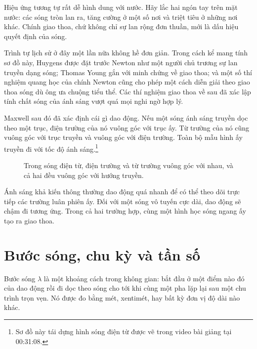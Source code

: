 Hiệu ứng tương tự rất dễ hình dung với nước. Hãy lắc hai ngón tay trên mặt nước: các sóng tròn lan ra, tăng cường ở một số nơi và triệt tiêu ở những nơi khác. Chính giao thoa, chứ không chỉ sự lan rộng đơn thuần, mới là dấu hiệu quyết định của sóng.

Trình tự lịch sử ở đây một lần nữa không hề đơn giản. Trong cách kể mang tính sơ đồ này, Huygens được đặt trước Newton như một người chủ trương sự lan truyền dạng sóng; Thomas Young gắn với minh chứng về giao thoa; và một số thí nghiệm quang học của chính Newton cũng cho phép một cách diễn giải theo giao thoa sóng dù ông ưa chuộng tiểu thể. Các thí nghiệm giao thoa về sau đã xác lập tính chất sóng của ánh sáng vượt quá mọi nghi ngờ hợp lý.

Maxwell sau đó đã xác định cái gì dao động. Nếu một sóng ánh sáng truyền dọc theo một trục, điện trường của nó vuông góc với trục ấy. Từ trường của nó cũng vuông góc với trục truyền và vuông góc với điện trường. Toàn bộ mẫu hình ấy truyền đi với tốc độ ánh sáng.\footnote{Sơ đồ này tái dựng hình sóng điện từ được vẽ trong video bài giảng tại 00:31:08.}

\begin{figure}[h]
\centering
{}
\caption{Trong sóng điện từ, điện trường và từ trường vuông góc với nhau, và cả hai đều vuông góc với hướng truyền.}
\end{figure}

Ánh sáng khả kiến thông thường dao động quá nhanh để có thể theo dõi trực tiếp các trường luân phiên ấy. Đối với một sóng vô tuyến cực dài, dao động sẽ chậm đi tương ứng. Trong cả hai trường hợp, cùng một hình học sóng ngang ấy tạo ra giao thoa.

\section{Bước sóng, chu kỳ và tần số}

Bước sóng \(\lambda\) là một khoảng cách trong không gian: bắt đầu ở một điểm nào đó của dao động rồi đi dọc theo sóng cho tới khi cùng một pha lặp lại sau một chu trình trọn vẹn. Nó được đo bằng mét, xentimét, hay bất kỳ đơn vị độ dài nào khác.

